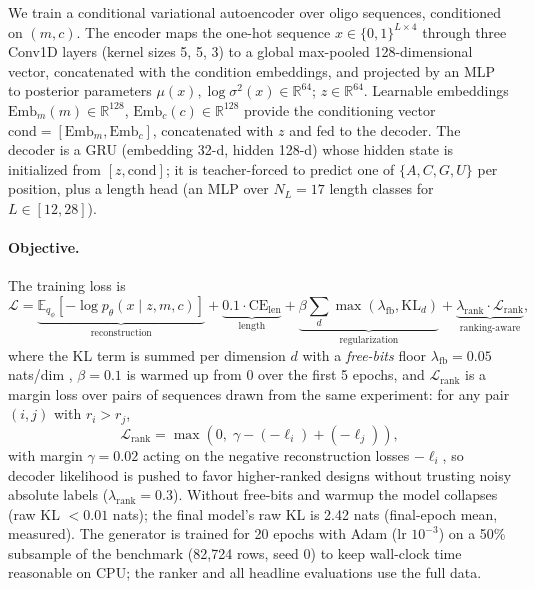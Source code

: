 \documentclass{article} %
\begin{document}
We train a conditional variational autoencoder \citep{kingma2014} over oligo sequences, conditioned on $(m, c)$. The encoder maps the one-hot sequence $x \in \{0,1\}^{L\times 4}$ through three Conv1D layers (kernel sizes 5, 5, 3) to a global max-pooled 128-dimensional vector, concatenated with the condition embeddings, and projected by an MLP to posterior parameters $\mu(x), \log\sigma^2(x) \in \mathbb{R}^{64}$; $z \in \mathbb{R}^{64}$. Learnable embeddings $\mathrm{Emb}_m(m) \in \mathbb{R}^{128}$, $\mathrm{Emb}_c(c) \in \mathbb{R}^{128}$ provide the conditioning vector $\mathrm{cond} = [\mathrm{Emb}_m, \mathrm{Emb}_c]$, concatenated with $z$ and fed to the decoder. The decoder is a GRU (embedding 32-d, hidden 128-d) whose hidden state is initialized from $[z, \mathrm{cond}]$; it is teacher-forced to predict one of $\{A,C,G,U\}$ per position, plus a length head (an MLP over $N_L = 17$ length classes for $L \in [12,28]$).

\paragraph{Objective.}
The training loss is
\begin{equation}
\mathcal{L} = \underbrace{\mathbb{E}_{q_\phi}[-\log p_\theta(x \mid z, m, c)]}_{\text{reconstruction}}
+ \underbrace{0.1 \cdot \mathrm{CE}_{\mathrm{len}}}_{\text{length}}
+ \underbrace{\beta \sum_d \max\left(\lambda_{\mathrm{fb}}, \mathrm{KL}_d\right)}_{\text{regularization}}
+ \underbrace{\lambda_{\mathrm{rank}} \cdot \mathcal{L}_{\mathrm{rank}}}_{\text{ranking-aware}},
\end{equation}
where the KL term is summed per dimension $d$ with a \emph{free-bits} floor $\lambda_{\mathrm{fb}} = 0.05$ nats/dim \citep{kingma2016}, $\beta = 0.1$ is warmed up from 0 over the first 5 epochs, and $\mathcal{L}_{\mathrm{rank}}$ is a margin loss over pairs of sequences drawn from the same experiment: for any pair $(i,j)$ with $r_i > r_j$,
\begin{equation}
\mathcal{L}_{\mathrm{rank}} = \max\left(0,\; \gamma - (-\ell_i) + (-\ell_j)\right),
\end{equation}
with margin $\gamma = 0.02$ acting on the negative reconstruction losses $-\ell_i$, so decoder likelihood is pushed to favor higher-ranked designs without trusting noisy absolute labels ($\lambda_{\mathrm{rank}} = 0.3$). Without free-bits and warmup the model collapses (raw KL $< 0.01$ nats); the final model's raw KL is 2.42 nats (final-epoch mean, measured). The generator is trained for 20 epochs with Adam (lr $10^{-3}$) on a 50\% subsample of the benchmark (82{,}724 rows, seed 0) to keep wall-clock time reasonable on CPU; the ranker and all headline evaluations use the full data.
\end{document}
